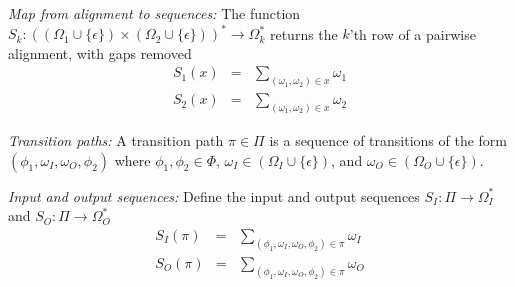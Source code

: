 \documentclass{article}
\newcommand\gappedalphabet[1]{(\Omega_{#1} \cup \{\epsilon\})}
\newcommand\gappedpair[2]{\gappedalphabet{#1} \times \gappedalphabet{#2}}
\newcommand\States{\Phi}
\begin{document}
{\em Map from alignment to sequences:}
The function $S_k:\left(\gappedpair{1}{2}\right)^\ast \to \Omega_k^\ast$ returns the $k$'th row of a pairwise alignment, with gaps removed
\begin{eqnarray*}
S_1(x) & = & \sum_{(\omega_1,\omega_2) \in x} \omega_1 \\
S_2(x) & = & \sum_{(\omega_1,\omega_2) \in x} \omega_2
\end{eqnarray*}

{\em Transition paths:}
A transition path $\pi \in \Pi$ 
is a sequence of transitions of the form $(\phi_1,\omega_I,\omega_O,\phi_2)$
where
$\phi_1,\phi_2 \in \States$,
$\omega_I \in \gappedalphabet{I}$, and
$\omega_O \in \gappedalphabet{O}$.

{\em Input and output sequences:}
Define the input and output sequences
$S_I:\Pi \to \Omega_I^\ast$ and
$S_O:\Pi \to \Omega_O^\ast$
\begin{eqnarray*}
S_I(\pi) & = & \sum_{(\phi_1,\omega_I,\omega_O,\phi_2) \in \pi} \omega_I \\
S_O(\pi) & = & \sum_{(\phi_1,\omega_I,\omega_O,\phi_2) \in \pi} \omega_O
\end{eqnarray*}




\end{document}
